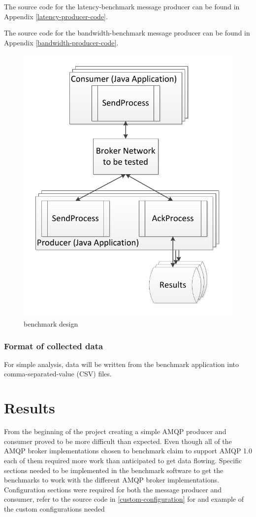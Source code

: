 \documentclass{thesis}
\begin{document}
The source code for the latency-benchmark message producer can be found in Appendix \ref{latency-producer-code}.

The source code for the bandwidth-benchmark message producer can be found in Appendix \ref{bandwidth-producer-code}.

\begin{figure}[h]
\centering
\label{Benchmark Design}
\includegraphics{benchmark_design}  
\caption{benchmark design}
\end{figure}

\subsection{Format of collected data}
For simple analysis, data will be written from the benchmark application into comma-separated-value (CSV) files.  

\chapter{Results}
From the beginning of the project creating a simple AMQP producer and consumer proved to be more difficult than expected.  Even though all of the AMQP broker implementations chosen to benchmark claim to support AMQP 1.0 each of them required more work than anticipated to get data flowing.  Specific sections needed to be implemented in the benchmark software to get the benchmarks to work with the different AMQP broker implementations.  Configuration sections were required for both the message producer and consumer, refer to the source code in \ref{custom-configuration} for and example of the custom configurations needed
\end{document}

